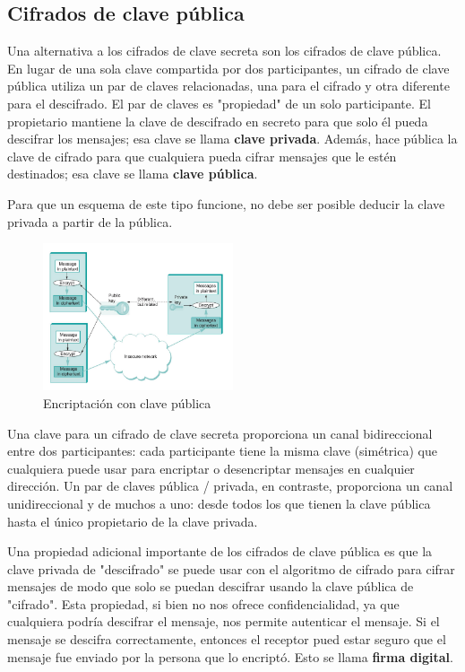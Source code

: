 \subsection{Cifrados de clave pública}
Una alternativa a los cifrados de clave secreta son los cifrados de clave pública. En lugar de una sola clave compartida por dos participantes, un cifrado de clave pública utiliza un par de claves relacionadas, una para el cifrado y otra diferente para el descifrado. El par de claves es "propiedad" de un solo participante. El propietario mantiene la clave de descifrado en secreto para que solo él pueda descifrar los mensajes; esa clave se llama \textbf{clave privada}. Además, hace pública la clave de cifrado para que cualquiera pueda cifrar mensajes que le estén destinados; esa clave se llama \textbf{clave pública}.

Para que un esquema de este tipo funcione, no debe ser posible deducir la clave privada a partir de la pública.

\begin{figure}[H]
	\centering
	\includegraphics[width=0.5\textwidth
]{images/public-key-encryption.png}
	\caption[Encriptación con clave pública]{Encriptación con clave pública}
	\label{fig:public-key-encryption}
\end{figure}

Una clave para un cifrado de clave secreta proporciona un canal bidireccional entre dos participantes: cada participante tiene la misma clave (simétrica) que cualquiera puede usar para encriptar o desencriptar mensajes en cualquier dirección. Un par de claves pública / privada, en contraste, proporciona un canal unidireccional y de muchos a uno: desde todos los que tienen la clave pública hasta el único propietario de la clave privada.

Una propiedad adicional importante de los cifrados de clave pública es que la clave privada de "descifrado" se puede usar con el algoritmo de cifrado para cifrar mensajes de modo que solo se puedan descifrar usando la clave pública de "cifrado". Esta propiedad, si bien no nos ofrece confidencialidad, ya que cualquiera podría descifrar el mensaje, nos permite autenticar el mensaje. Si el mensaje se descifra correctamente, entonces el receptor pued estar seguro que el mensaje fue enviado por la persona que lo encriptó. Esto se llama \textbf{firma digital}.

